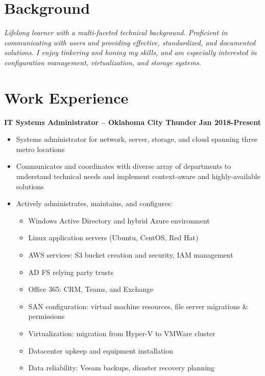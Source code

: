 \documentclass[line]{res}
\begin{document}

\address{Oklahoma City, OK $\parallel$ trjean.ou@gmail.com $\parallel$ (580) 304-6896}

\begin{resume}

\section{Background}
\emph{Lifelong learner with a multi-faceted technical background. Proficient in communicating with users and providing effective, standardized, and documented solutions. I enjoy tinkering and honing my skills, and am especially interested in configuration management, virtualization, and storage systems.}

\section{Work Experience}
\textbf{IT Systems Administrator -- Oklahoma City Thunder}
\newline
\textbf{Jan 2018-Present}
\begin{itemize}
	\item Systems administrator for network, server, storage, and cloud spanning three metro locations
	\item Communicates and coordinates with diverse array of departments to understand technical needs and implement context-aware and highly-available solutions
	\item Actively administrates, maintains, and configures:
		\begin{itemize}
			\item Windows Active Directory and hybrid Azure environment
			\item Linux application servers (Ubuntu, CentOS, Red Hat)
			\item AWS services: S3 bucket creation and security, IAM management
			\item AD FS relying party trusts
			\item Office 365: CRM, Teams, and Exchange
			\item SAN configuration: virtual machine resources, file server migrations \& permissions
			\item Virtualization: migration from Hyper-V to VMWare cluster
			\item Datacenter upkeep and equipment installation
			\item Data reliability: Veeam backups, disaster recovery planning

\end{itemize}
\end{itemize}
\end{resume}
\end{document}
